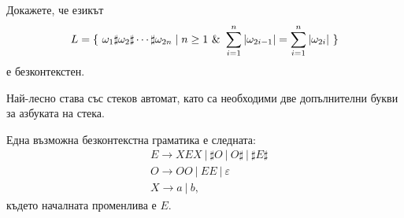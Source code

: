 \begin{problem}
  Докажете, че езикът
  \[L = \{\ \omega_1 \sharp \omega_2 \sharp \cdots \sharp \omega_{2n} \mid n \geq 1\ \&\ \sum^n_{i=1}\abs{\omega_{2i-1}} = \sum^{n}_{i=1}\abs{\omega_{2i}}\ \}\]
  е безконтекстен.
\end{problem}
\begin{hint}
  Най-лесно става със стеков автомат, като са необходими две допълнителни букви за азбуката на стека.

  Една възможна безконтекстна граматика е следната:
  \begin{align*}
    & E \to XEX\ |\ \sharp O\ |\ O\sharp\ |\ \sharp E\sharp\\
    & O \to OO\ |\ EE\ |\ \varepsilon\\
    & X \to a\ |\ b,
  \end{align*}
  където началната променлива е $E$.
\end{hint}


